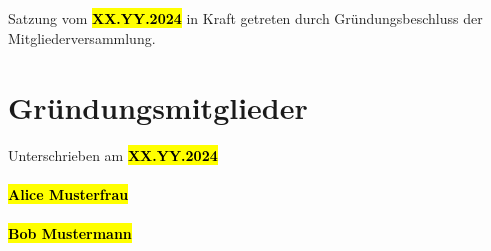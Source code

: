 \documentclass[a4paper]{article}
\renewcommand\thesection{§ \arabic{section}}
\begin{document}
\renewcommand\thesection{}
\section{}
Satzung vom \textcolor{red}{\textbf{\hl{XX.YY.2024}}} in Kraft getreten durch Gründungsbeschluss der Mitgliederversammlung.


\pagebreak
\renewcommand\thesection{}
\section{Gründungsmitglieder}
Unterschrieben am \textcolor{red}{\textbf{\hl{XX.YY.2024}}} \\ \\
\textcolor{red}{\textbf{\hl{Alice Musterfrau\\ \\ Bob Mustermann}}}
\end{document}
